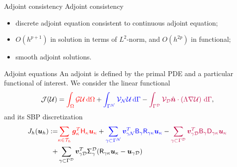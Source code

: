 \documentclass{beamer}
\begin{document}
\begin{frame}{Adjoint consistency}
    Adjoint consistency
    \begin{itemize}
        \item discrete adjoint equation consistent to continuous adjoint equation;
        \item $O(h^{p+1})$ in solution in terms of $L^2$-norm, and $O(h^{2p})$ in functional;
        \item smooth adjoint solutions.
    \end{itemize}
\end{frame}
\begin{frame}{Adjoint equations}
    An adjoint is defined by the primal PDE and a particular functional of interest. We consider the linear functional
    \begin{equation*}
    \mathcal{J}(\mathcal{U}) = {\color{red}\int_{\Omega} \mathcal{G} \mathcal{U} \, \mathrm{d} \Omega}
    +  {\color{blue}\int_{\Gamma^{\mathcal{N}}} \mathcal{V}_{\mathcal{N}} \mathcal{U} \, \mathrm{d}\Gamma }
    -  {\color{purple}\int_{\Gamma^{\mathcal{D}}} \mathcal{V}_{\mathcal{D}} \hat{\bm{n}} \cdot \left(\Lambda \nabla \mathcal{U} \right) \, \mathrm{d}\Gamma} ,
    \end{equation*}
    and its SBP discretization
    \begin{equation*}
    \begin{aligned}
    J_h(\bm{u}_h) :=& {\color{red}\sum_{\kappa \in \mathcal{T}_{h}}\bm{g}_{\kappa}^T\mathsf{H}_{\kappa}\bm{u}_\kappa}
    + {\color{blue}\sum_{\gamma \subset \Gamma^{\mathcal{N}}} \bm{v}_{\gamma \mathcal{N}}^T\mathsf{B}_{\gamma}\mathsf{R}_{\gamma\kappa}\bm{u}_\kappa}
    - {\color{purple}\sum_{\gamma \subset \Gamma^{\mathcal{D}}} \bm{v}_{\gamma \mathcal{D}}^T\mathsf{B}_{\gamma}\mathsf{D}_{\gamma\kappa}\bm{u}_\kappa} \\
    +& \sum_{\gamma \subset \Gamma^{\mathcal{D}}} \bm{v}_{\gamma \mathcal{D}}^T\mathsf{\Sigma}_{\gamma}^{\mathcal{D}} (\mathsf{R}_{\gamma\kappa}\bm{u}_\kappa - \bm{u}_{\gamma \mathcal{D}})
    \end{aligned}
    \end{equation*}
\end{frame}
\end{document}
